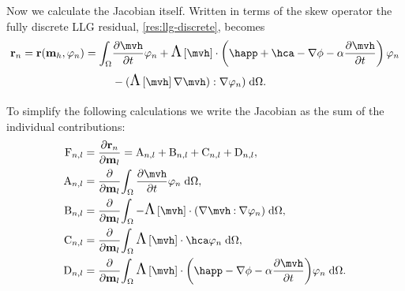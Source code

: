 {%

Now we calculate the Jacobian itself.
Written in terms of the skew operator the fully discrete LLG residual, \cref{res:llg-discrete}, becomes
\begin{equation}
  \begin{aligned}
    \rllgv_n = \rllgv(\mv_h, \tbf_n) = \int_{\magd}
    & \dmdth \tbf_n + \skewm{\mvh} \cdot \left( \happ + \hca - \grad \phi - \dampc \dmdth
    \right) \tbf_n \\
    &- (\skewm{\mvh} \grad \mvh) : \grad \tbf_n)
    \d\magd.
  \end{aligned}
\end{equation}

To simplify the following calculations we write the Jacobian as the sum of the individual contributions:
\begin{equation}
  \begin{aligned}
    \Fm_{n,l} &= \pd{\rllgv_n}{\mv_l} = \Am_{n,l} + \Bm_{n,l} + \Cm_{n,l} + \Dm_{n,l}, \\
    \Am_{n,l} &= \pd{}{\mv_l} \intd{\dmdth \tbf_n}, \\
    \Bm_{n,l} &= \pd{}{\mv_l} \intd{- \skewm{\mvh} \cdot (\grad \mvh \compdot \grad \tbf_n)}, \\
    \Cm_{n,l} &= \pd{}{\mv_l} \intd{ \skewm{\mvh} \cdot \hca  \tbf_n}, \\
    \Dm_{n,l} &= \pd{}{\mv_l} \intd{  \skewm{\mvh} \cdot \bigb{ \happ - \grad \phi - \dampc \dmdth} \tbf_n}.
  \end{aligned}
\end{equation}

}
